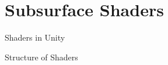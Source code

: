 \part{Subsurface Shaders}
\frame{\partpage}


\begin{frame}{Shaders in Unity}
\end{frame}

\begin{frame}{Structure of Shaders}
\end{frame}